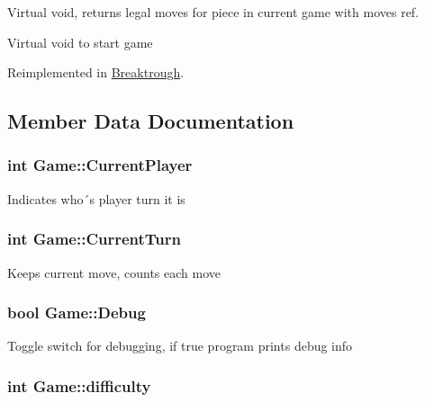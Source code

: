 Virtual void, returns legal moves for piece in current game with moves ref. 

Virtual void to start game 

Reimplemented in \hyperlink{class_breaktrough_a1e4b2c80e074f7052c4c491abe95c9f6}{Breaktrough}.



\subsection{Member Data Documentation}
\hypertarget{class_game_a661282d67a0e4a972293c98478bc02e4}{
\subsubsection[{Current\-Player}]{\setlength{\rightskip}{0pt plus 5cm}int Game\-::\-Current\-Player\hspace{0.3cm}{\ttfamily [protected]}}}\label{class_game_a661282d67a0e4a972293c98478bc02e4}
Indicates who´s player turn it is \hypertarget{class_game_a88700a4643e08b12130ba2950c54ed8b}{
\subsubsection[{Current\-Turn}]{\setlength{\rightskip}{0pt plus 5cm}int Game\-::\-Current\-Turn\hspace{0.3cm}{\ttfamily [protected]}}}\label{class_game_a88700a4643e08b12130ba2950c54ed8b}
Keeps current move, counts each move \hypertarget{class_game_ad79740c2d2fa299cf322bf6ea322d9aa}{
\subsubsection[{Debug}]{\setlength{\rightskip}{0pt plus 5cm}bool Game\-::\-Debug}}\label{class_game_ad79740c2d2fa299cf322bf6ea322d9aa}
Toggle switch for debugging, if true program prints debug info \hypertarget{class_game_a536a6390d16f05d402928bd731e06ef3}{
\subsubsection[{difficulty}]{\setlength{\rightskip}{0pt plus 5cm}int Game\-::difficulty\hspace{0.3cm}{\ttfamily [protected]}}}\label{class_game_a536a6390d16f05d402928bd731e06ef3}
